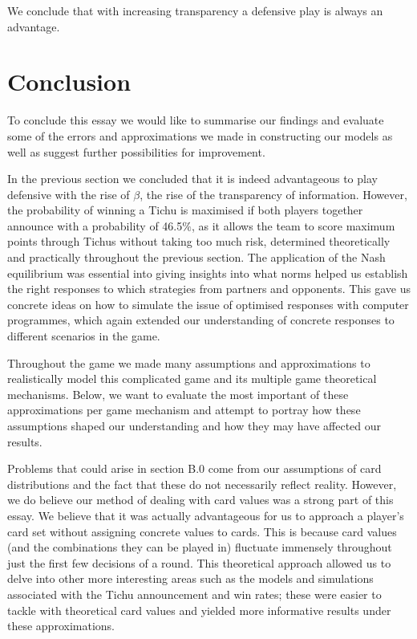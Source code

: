 We conclude that with increasing transparency a defensive play is always an advantage.

\section{Conclusion}
To conclude this essay we would like to summarise our findings and evaluate some of the errors and approximations we made in constructing our models as well as suggest further possibilities for improvement.

In the previous section we concluded that it is indeed advantageous to play defensive with the rise of $\beta$, the rise of the transparency of information. However, the probability of winning a Tichu is maximised if both players together announce with a probability of 46.5$\%$, as it allows the team to score maximum points through Tichus without taking too much risk, determined theoretically and practically throughout the previous section. The application of the Nash equilibrium was essential into giving insights into what norms helped us establish the right responses to which strategies from partners and opponents. This gave us concrete ideas on how to simulate the issue of optimised responses with computer programmes, which again extended our understanding of concrete responses to different scenarios in the game.

Throughout the game we made many assumptions and approximations to realistically model this complicated game and its multiple game theoretical mechanisms. Below, we want to evaluate the most important of these approximations per game mechanism and attempt to portray how these assumptions shaped our understanding and how they may have affected our results.

Problems that could arise in section B.0 come from our assumptions of card distributions and the fact that these do not necessarily reflect reality. However, we do believe our method of dealing with card values was a strong part of this essay. We believe that it was actually advantageous for us to approach a player’s card set without assigning concrete values to cards. This is because card values (and the combinations they can be played in) fluctuate immensely throughout just the first few decisions of a round. This theoretical approach allowed us to delve into other more interesting areas such as the models and simulations associated with the Tichu announcement and win rates; these were easier to tackle with theoretical card values and yielded more informative results under these approximations.

